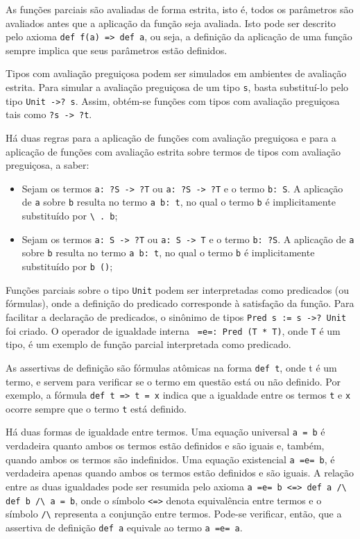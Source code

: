 As funções parciais são avaliadas de forma estrita, isto é, todos os parâmetros são avaliados antes que a aplicação da função seja avaliada.
Isto pode ser descrito pelo axioma \Verb.def f(a) => def a., ou seja, a definição da aplicação de uma função sempre implica que seus parâmetros estão definidos.

Tipos com avaliação preguiçosa podem ser simulados em ambientes de avaliação estrita.
Para simular a avaliação preguiçosa de um tipo \Verb.s., basta substituí-lo pelo tipo \Verb.Unit ->? s..
Assim, obtém-se funções com tipos com avaliação preguiçosa tais como \Verb.?s -> ?t..

Há duas regras para a aplicação de funções com avaliação preguiçosa e para a aplicação de funções com avaliação estrita sobre termos de tipos com avaliação preguiçosa, a saber:

\begin{itemize}
    \item Sejam os termos \Verb.a: ?S -> ?T. ou \Verb.a: ?S -> ?T. e o termo \Verb.b: S.. A aplicação de \Verb.a. sobre \Verb.b. resulta no termo \Verb.a b: t., no qual o termo \Verb.b. é implicitamente substituído por \Verb_\ . b_;
    \item Sejam os termos \Verb.a: S -> ?T. ou \Verb.a: S -> T. e o termo \Verb.b: ?S.. A aplicação de \Verb.a. sobre \Verb.b. resulta no termo \Verb.a b: t., no qual o termo \Verb.b. é implicitamente substituído por \Verb.b ().;
\end{itemize}

Funções parciais sobre o tipo \Verb.Unit. podem ser interpretadas como predicados (ou fórmulas), onde a definição do predicado corresponde à satisfação da função.
Para facilitar a declaração de predicados, o sinônimo de tipos \Verb.Pred s := s ->? Unit. foi criado.
O operador de igualdade interna \Verb. =e=: Pred (T * T)., onde \Verb.T. é um tipo, é um exemplo de função parcial interpretada como predicado.

As assertivas de definição são fórmulas atômicas na forma \Verb.def t., onde t é um termo, e servem para verificar se o termo em questão está ou não definido.
Por exemplo, a fórmula \Verb.def t => t = x. indica que a igualdade entre os termos \Verb.t. e \Verb.x. ocorre sempre que o termo \Verb.t. está definido.

Há duas formas de igualdade entre termos.
Uma equação universal \Verb.a = b. é verdadeira quanto ambos os termos estão definidos e são iguais e, também, quando ambos os termos são indefinidos.
Uma equação existencial \Verb.a =e= b., é verdadeira apenas quando ambos os termos estão definidos e são iguais.
A relação entre as duas igualdades pode ser resumida pelo axioma \Verb.a =e= b <=> def a /\ def b /\ a = b., onde o símbolo \Verb.<=>. denota equivalência entre termos e o símbolo \Verb./\. representa a conjunção entre termos.
Pode-se verificar, então, que a assertiva de definição \Verb.def a. equivale ao termo \Verb.a =e= a..

